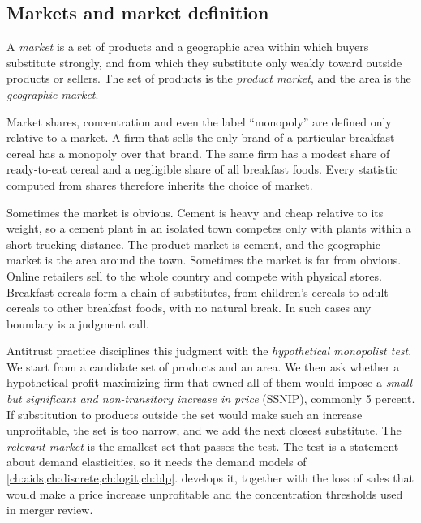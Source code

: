 \subsection{Markets and market definition}\label{sec:01-market-definition}

\begin{definition}[Market]\label{def:01-market}
A \emph{market} is a set of products and a geographic area within which buyers substitute strongly, and from
which they substitute only weakly toward outside products or sellers. The set of products is the
\emph{product market}, and the area is the \emph{geographic market}.
\end{definition}

Market shares, concentration and even the label ``monopoly'' are defined only relative to a market. A firm
that sells the only brand of a particular breakfast cereal has a monopoly over that brand. The same firm has a
modest share of ready-to-eat cereal and a negligible share of all breakfast foods. Every statistic computed
from shares therefore inherits the choice of market.

Sometimes the market is obvious. Cement is heavy and cheap relative to its weight, so a cement plant in an
isolated town competes only with plants within a short trucking distance. The product market is cement, and
the geographic market is the area around the town. Sometimes the market is far from obvious. Online retailers
sell to the whole country and compete with physical stores. Breakfast cereals form a chain of substitutes, from
children's cereals to adult cereals to other breakfast foods, with no natural break. In such cases any boundary
is a judgment call.

Antitrust practice disciplines this judgment with the \emph{hypothetical monopolist test}. We start from a
candidate set of products and an area. We then ask whether a hypothetical profit-maximizing firm that owned all
of them would impose a \emph{small but significant and non-transitory increase in price} (SSNIP), commonly 5
percent. If substitution to products outside the set would make such an increase unprofitable, the set is too
narrow, and we add the next closest substitute. The \emph{relevant market} is the smallest set that passes the
test. The test is a statement about demand elasticities, so it needs the demand models of
\cref{ch:aids,ch:discrete,ch:logit,ch:blp}.  develops it, together with the loss of sales that
would make a price increase unprofitable and the concentration thresholds used in merger review.

